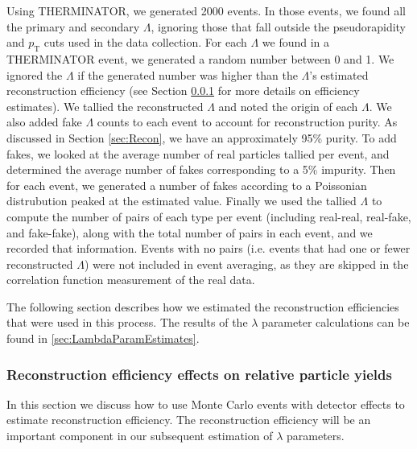 Using THERMINATOR, we generated 2000 events. 
In those events, we found all the primary and secondary $\Lambda$, ignoring those that fall outside the pseudorapidity and $p_\mathrm{T}$ cuts used in the data collection.
For each $\Lambda$ we found in a THERMINATOR event, we generated a random number between 0 and 1. 
We ignored the $\Lambda$ if the generated number was higher than the $\Lambda$'s estimated reconstruction efficiency (see Section \ref{sec:ReconstructionEff} for more details on efficiency estimates). 
We tallied the reconstructed $\Lambda$ and noted the origin of each $\Lambda$.
We also added fake $\Lambda$ counts to each event to account for reconstruction purity.
As discussed in Section \ref{sec:Recon}, we have an approximately 95\% purity.
To add fakes, we looked at the average number of real particles tallied per event, and determined the average number of fakes corresponding to a 5\% impurity.
Then for each event, we generated a number of fakes according to a Poissonian distrubution peaked at the estimated value.
Finally we used the tallied $\Lambda$ to compute the number of pairs of each type per event (including real-real, real-fake, and fake-fake), along with the total number of pairs in each event, and we recorded that information.
Events with no pairs (i.e. events that had one or fewer reconstructed $\Lambda$) were not included in event averaging, as they are skipped in the correlation function measurement of the real data.



The following section describes how we estimated the reconstruction efficiencies that were used in this process.
The results of the $\lambda$ parameter calculations can be found in \ref{sec:LambdaParamEstimates}.

\subsubsection{Reconstruction efficiency effects on relative particle yields}
\label{sec:ReconstructionEff}

In this section we discuss how to use Monte Carlo events with detector effects to estimate reconstruction efficiency.  
The reconstruction efficiency will be an important component in our subsequent estimation of $\lambda$ parameters.



